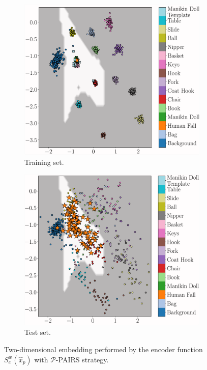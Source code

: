 \begin{figure}[h!]
	\centering
	\begin{subfigure}[b]{0.475\textwidth}   
		\centering 
		\includegraphics[width=\textwidth]{img/eeai/embedding/positive_template_pairs_only/fold_4_train}
		\caption[]%
		{Training set.}    
		\label{fig:train-p-pairs}
	\end{subfigure}
	\quad
	\begin{subfigure}[b]{0.475\textwidth}   
		\centering 
		\includegraphics[width=\textwidth]{img/eeai/embedding/positive_template_pairs_only/fold_4_moquette}
		\caption[]%
		{Test set.}    
		\label{fig:test-p-pairs}
	\end{subfigure}
	\caption[]
	{\small Two-dimensional embedding performed by the encoder function $S_e^w(\hat{x}_{p})$ with $\mathcal{P}$-PAIRS strategy.} 
	\label{fig:p-pairs}
\end{figure}


